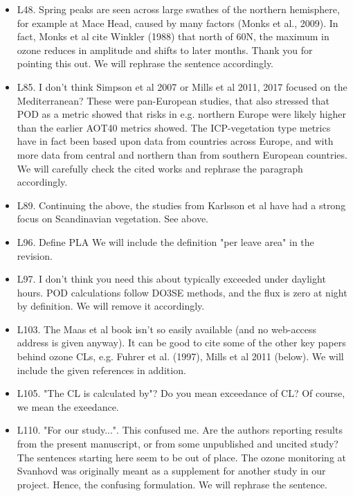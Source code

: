 \documentclass{scrartcl}
\begin{document}
\begin{itemize}
\item {\color{blue}L48. Spring peaks are seen across large swathes of the northern hemisphere, for example at Mace Head, caused by many factors (Monks et al., 2009). In fact, Monks et al cite Winkler (1988) that north of 60N, the maximum in ozone reduces in amplitude and shifts to later months.}
Thank you for pointing this out. We will rephrase the sentence accordingly.

\item {\color{blue}L85. I don't think Simpson et al 2007 or Mills et al 2011, 2017 focused on the Mediterranean? These were pan-European studies, that also stressed that POD as a metric showed that risks in e.g. northern Europe were likely higher than the earlier AOT40 metrics showed. The ICP-vegetation type metrics have in fact been based upon data from countries across Europe, and with more data from central and northern than from southern European countries.}
We will carefully check the cited works and rephrase the paragraph accordingly. 

\item {\color{blue}L89. Continuing the above, the studies from Karlsson et al have had a strong focus on Scandinavian vegetation.}
See above.

\item {\color{blue}L96. Define PLA}
We will include the definition "per leave area" in the revision.

\item {\color{blue}L97. I don't think you need this about typically exceeded under daylight hours. POD calculations follow DO3SE methods, and the flux is zero at night by definition.} We will remove it accordingly.

\item {\color{blue}L103. The Maas et al book isn't so easily available (and no web-access address is given anyway). It can be good to cite some of the other key papers behind ozone CLs, e.g. Fuhrer et al. (1997), Mills et al 2011 (below).} We will include the given references in addition.

\item {\color{blue}L105. "The CL is calculated by"? Do you mean exceedance of CL?} Of course, we mean the exeedance.

\item {\color{blue}L110. "For our study...". This confused me. Are the authors reporting results from the present manuscript, or from some unpublished and uncited study? The sentences starting here seem to be out of place.}
The ozone monitoring at Svanhovd was originally meant as a supplement for another study in our project. Hence, the confusing formulation. We will rephrase the sentence.


\end{itemize}
\end{document}
